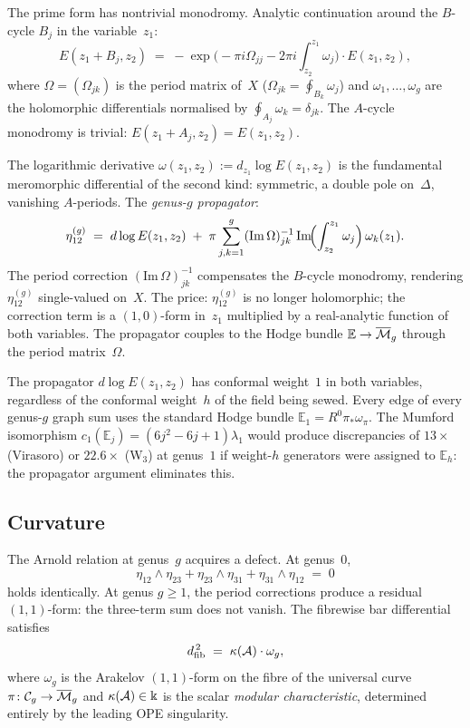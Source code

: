 The prime form has nontrivial monodromy. Analytic continuation
around the $B$-cycle $B_j$ in the variable~$z_1$:
\[
E(z_1+B_j,z_2)
\;=\;
-\exp\bigl(
-\pi i\Omega_{jj}-2\pi i\textstyle\int_{z_2}^{z_1}\omega_j
\bigr)
\cdot E(z_1,z_2),
\]
where $\Omega=(\Omega_{jk})$ is the period matrix of~$X$
($\Omega_{jk}=\oint_{B_k}\omega_j$) and
$\omega_1,\dots,\omega_g$ are the holomorphic differentials
normalised by $\oint_{A_j}\omega_k=\delta_{jk}$. The
$A$-cycle monodromy is trivial: $E(z_1+A_j,z_2)=E(z_1,z_2)$.

The logarithmic derivative
$\omega(z_1,z_2) := d_{z_1}\log E(z_1,z_2)$
is the fundamental meromorphic differential of the second kind:
symmetric, a double pole on~$\Delta$, vanishing $A$-periods. The
\emph{genus-$g$ propagator}:
\[
\eta^{(g)}_{12}
\;=\;
d\log E(z_1,z_2)
\;+\;
\pi\sum_{j,k=1}^{g}
(\mathrm{Im}\,\Omega)^{-1}_{jk}\,
\mathrm{Im}\!\Bigl(\int_{z_2}^{z_1}\omega_j\Bigr)\,
\omega_k(z_1).
\]
The period correction $(\mathrm{Im}\,\Omega)^{-1}_{jk}$
compensates the $B$-cycle monodromy, rendering $\eta^{(g)}_{12}$
single-valued on~$X$. The price: $\eta^{(g)}_{12}$ is no longer
holomorphic; the correction term is a $(1,0)$-form in~$z_1$
multiplied by a real-analytic function of both variables. The
propagator couples to the Hodge bundle
$\mathbb E\to\overline{\mathcal{M}}_g$ through the period
matrix~$\Omega$.

The propagator $d\log E(z_1,z_2)$ has conformal weight~$1$ in both
variables, regardless of the conformal weight~$h$ of the field
being sewed. Every edge of every genus-$g$ graph sum uses the
standard Hodge bundle $\mathbb E_1 = R^0\pi_*\omega_\pi$. The
Mumford isomorphism $c_1(\mathbb E_j) = (6j^2-6j+1)\lambda_1$
would produce discrepancies of $13\times$ (Virasoro) or $22.6\times$
(W$_3$) at genus~$1$ if weight-$h$ generators were assigned to
$\mathbb E_h$: the propagator argument eliminates this.

\subsection*{Curvature}

The Arnold relation at genus~$g$ acquires a defect. At genus~$0$,
\[
\eta_{12}\wedge\eta_{23}
+\eta_{23}\wedge\eta_{31}
+\eta_{31}\wedge\eta_{12}
\;=\;0
\]
holds identically. At genus $g\ge 1$, the period corrections
produce a residual $(1,1)$-form: the three-term sum does not vanish.
The fibrewise bar differential satisfies
\begin{equation}\label{eq:pref-curvature}
d_{\mathrm{fib}}^{\,2}\;=\;\kappa(\mathcal{A})\cdot\omega_g,
\end{equation}
where $\omega_g$ is the Arakelov $(1,1)$-form on the fibre of the
universal curve $\pi\colon\mathcal C_g\to\overline{\mathcal{M}}_g$
and $\kappa(\mathcal{A})\in\Bbbk$ is the scalar \emph{modular
characteristic}, determined entirely by the leading OPE singularity.

